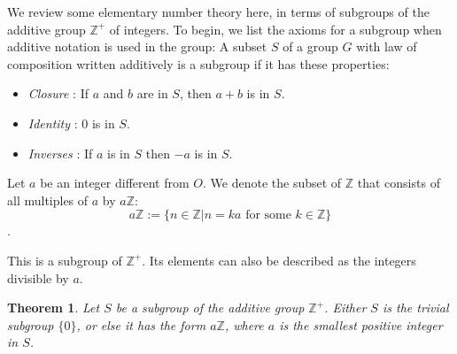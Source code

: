\documentclass[
]{book}
\providecommand{\tightlist}{%
  \setlength{\itemsep}{0pt}\setlength{\parskip}{0pt}}
\newtheorem{theorem}{Theorem}[chapter]
\theoremstyle{definition}
\theoremstyle{definition}
\theoremstyle{definition}
\theoremstyle{definition}
\theoremstyle{remark}
\begin{document}
We review some elementary number theory here, in terms of subgroups of the additive group \(\mathbb{Z}^+\) of integers. To begin, we list the axioms for a subgroup when additive notation is used in the group: A subset \(S\) of a group \(G\) with law of composition written additively is a subgroup if it has these properties:

\begin{itemize}
\tightlist
\item
  \emph{Closure} : If \(a\) and \(b\) are in \(S\), then \(a + b\) is in \(S\).
\item
  \emph{Identity} : \(0\) is in \(S\).
\item
  \emph{Inverses} : If \(a\) is in \(S\) then \(-a\) is in \(S\).
\end{itemize}

Let \(a\) be an integer different from \(O\).
We denote the subset of \(\mathbb{Z}\) that consists of all
multiples of \(a\) by \(a\mathbb{Z}\):
\[a\mathbb{Z} := \{n \in \mathbb{ Z} | n = ka \text{ for some } k\in \mathbb{Z}\} \].

This is a subgroup of \(\mathbb{Z}^+\). Its elements can also be described as the integers divisible by \(a\).

\begin{theorem}
\protect\hypertarget{thm:unnamed-chunk-15}{}\label{thm:unnamed-chunk-15}Let \(S\) be a subgroup of the additive group \(\mathbb{Z}^+\). Either \(S\) is the trivial subgroup
\(\{0\}\), or else it has the form \(a\mathbb{Z}\), where \(a\) is the smallest positive integer in \(S\).
\end{theorem}
\end{document}
